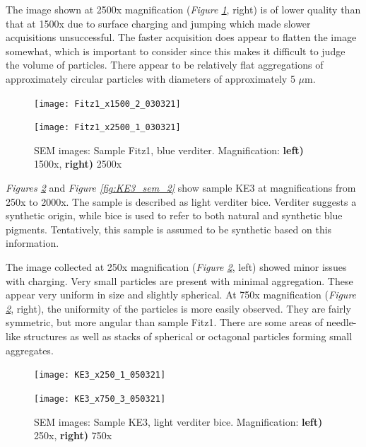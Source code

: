The image shown at 2500x magnification (\textit{Figure \ref{fig:Fitz1_sem_2}}, right) is of lower quality than that at 1500x due to surface charging and jumping which made slower acquisitions unsuccessful. The faster acquisition does appear to flatten the image somewhat, which is important to consider since this makes it difficult to judge the volume of particles. There appear to be relatively flat aggregations of approximately circular particles with diameters of approximately 5 $\mu$m.

\begin{figure}[H]
\centering
\begin{minipage}{.45\textwidth}
  \centering
  \texttt{[image: Fitz1\_x1500\_2\_030321]}
\end{minipage}
\begin{minipage}{.45\textwidth}
  \centering
  \texttt{[image: Fitz1\_x2500\_1\_030321]}
\end{minipage}
\caption[SEM images: Sample Fitz1, blue verditer]{SEM images: Sample Fitz1, blue verditer. Magnification: \textbf{left)} 1500x, \textbf{right)} 2500x}
\label{fig:Fitz1_sem_2}
\end{figure}


\textit{Figures \ref{fig:KE3_sem_1}} and \textit{Figure \ref{fig:KE3_sem_2}} show sample KE3 at magnifications from 250x to 2000x. The sample is described as light verditer bice. Verditer suggests a synthetic origin, while bice is used to refer to both natural and synthetic blue pigments. Tentatively, this sample is assumed to be synthetic based on this information.

The image collected at 250x magnification (\textit{Figure \ref{fig:KE3_sem_1}}, left) showed minor issues with charging. Very small particles are present with minimal aggregation. These appear very uniform in size and slightly spherical. At 750x magnification (\textit{Figure \ref{fig:KE3_sem_1}}, right), the uniformity of the particles is more easily observed. They are fairly symmetric, but more angular than sample Fitz1. There are some areas of needle-like structures as well as stacks of spherical or octagonal particles forming small aggregates.

\begin{figure}[H]
\centering
\begin{minipage}{.45\textwidth}
  \centering
  \texttt{[image: KE3\_x250\_1\_050321]}
\end{minipage}
\begin{minipage}{.45\textwidth}
  \centering
  \texttt{[image: KE3\_x750\_3\_050321]}
\end{minipage}
\caption[SEM images: Sample KE3, light verditer bice]{SEM images: Sample KE3, light verditer bice. Magnification: \textbf{left)} 250x, \textbf{right)} 750x}
\label{fig:KE3_sem_1}
\end{figure}

